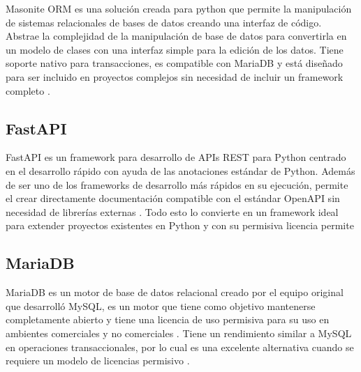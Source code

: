 Masonite ORM es una solución creada para python que permite la manipulación de sistemas relacionales de bases de datos creando una interfaz de código. Abstrae la complejidad de la manipulación de base de datos para convertirla en un modelo de clases con una interfaz simple para la edición de los datos. Tiene soporte nativo para transacciones, es compatible con MariaDB y está diseñado para ser incluido en proyectos complejos sin necesidad de incluir un framework completo \cite{masonite_2021}.

\subsection{FastAPI}

FastAPI es un framework para desarrollo de APIs REST para Python centrado en el desarrollo rápido con ayuda de las anotaciones estándar de Python. Además de ser uno de los frameworks de desarrollo más rápidos en su ejecución, permite el crear directamente documentación compatible con el estándar OpenAPI sin necesidad de librerías externas \cite{fastapi_ramirez_2020}. Todo esto lo convierte en un framework ideal para extender proyectos existentes en Python y con su permisiva licencia permite %

\subsection{MariaDB}


MariaDB es un motor de base de datos relacional creado por el equipo original que desarrolló MySQL, es un motor que tiene como objetivo mantenerse completamente abierto y tiene una licencia de uso permisiva para su uso en ambientes comerciales y no comerciales \cite{mariadb_foundation_2019}. Tiene un rendimiento similar a MySQL en operaciones transaccionales, por lo cual es una excelente alternativa cuando se requiere un modelo de licencias permisivo \cite{mariadb_comparison}.



